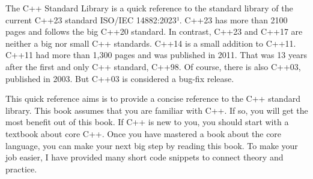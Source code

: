 The C++ Standard Library is a quick reference to the standard library of the current C++23 standard ISO/IEC 14882:2023¹. C++23 has more than 2100 pages and follows the big C++20 standard. In contrast, C++23 and C++17 are neither a big nor small C++ standards. C++14 is a small addition to C++11.
C++11 had more than 1,300 pages and was published in 2011. That was 13 years after the first and only C++ standard, C++98. Of course, there is also C++03, published in 2003. But C++03 is considered a bug-fix release.

This quick reference aims is to provide a concise reference to the C++ standard library. This book assumes that you are familiar with C++. If so, you will get the most benefit out of this book. If C++ is new to you, you should start with a textbook about core C++. Once you have mastered a book about the core language, you can make your next big step by reading this book. To make your job easier, I have provided many short code snippets to connect theory and practice.